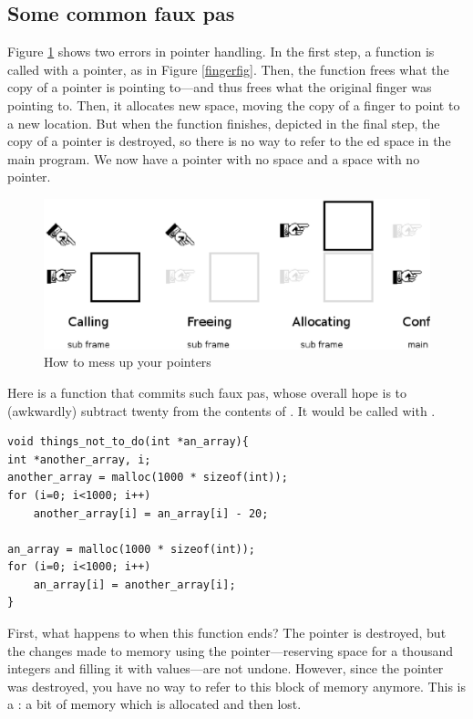 \documentclass[12pt]{article}
\begin{document}
\subsection{Some common faux pas} 
Figure \ref{fauxpas} shows two errors in pointer handling. In the first
step, a function is called with a pointer, as in Figure
\ref{fingerfig}. Then, the function frees what the copy of a pointer
is pointing to---and thus frees what the original finger was pointing
to. Then, it allocates new space, moving the copy of a finger to point to
a new location. But when the function finishes, depicted in the final
step, the copy of a pointer is destroyed, so there is no way to refer to
the ed space in the main program. We now have a pointer
with no space and a space with no pointer.

\begin{figure}
\hskip -1cm
\includegraphics[width=\textwidth*\real{1.1}]{pointer_faux_pas.ps}
\caption{How to mess up your pointers}
\label{fauxpas}
\end{figure}


Here is a function that commits such faux pas,
whose overall hope is to (awkwardly) subtract twenty from
the contents of . It would be called with
.  
\begin{lstlisting}
void things_not_to_do(int *an_array){
int *another_array, i;
another_array = malloc(1000 * sizeof(int));
for (i=0; i<1000; i++)
    another_array[i] = an_array[i] - 20;

an_array = malloc(1000 * sizeof(int));
for (i=0; i<1000; i++)
    an_array[i] = another_array[i];
}
\end{lstlisting}

First, what happens to  when this function
ends? The pointer is destroyed, but the changes made to memory using
the pointer---reserving space for a thousand integers and filling it
with values---are not undone. However, since the pointer was destroyed,
you have no way to refer to this block of memory anymore.  This is a
: a bit of memory which is allocated and then lost.
\end{document}
